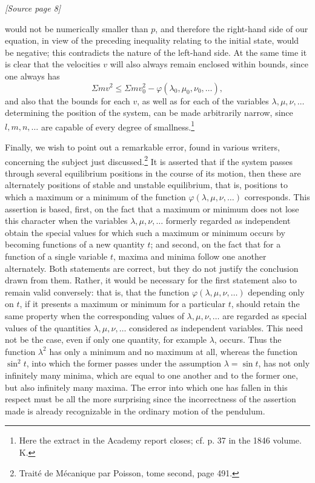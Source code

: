 \documentclass[11pt]{article}
\newcommand{\sourcepage}[1]{\par\smallskip\noindent\textit{[Source page #1]}\par\smallskip}
\begin{document}
\sourcepage{8}

\noindent would not be numerically smaller than $p$, and therefore the right-hand side of our equation, in view of the preceding inequality relating to the initial state, would be negative; this contradicts the nature of the left-hand side. At the same time it is clear that the velocities $v$ will also always remain enclosed within bounds, since one always has
\[
\Sigma m v^2 \leq \Sigma m v_0^2-\varphi(\lambda_0,\mu_0,\nu_0,\ldots),
\]
and also that the bounds for each $v$, as well as for each of the variables $\lambda,\mu,\nu,\ldots$ determining the position of the system, can be made arbitrarily narrow, since $l,m,n,\ldots$ are capable of every degree of smallness.\footnote{Here the extract in the Academy report closes; cf. p. 37 in the 1846 volume. K.}

Finally, we wish to point out a remarkable error, found in various writers, concerning the subject just discussed.\footnote{Traité de Mécanique par Poisson, tome second, page 491.} It is asserted that if the system passes through several equilibrium positions in the course of its motion, then these are alternately positions of stable and unstable equilibrium, that is, positions to which a maximum or a minimum of the function $\varphi(\lambda,\mu,\nu,\ldots)$ corresponds. This assertion is based, first, on the fact that a maximum or minimum does not lose this character when the variables $\lambda,\mu,\nu,\ldots$ formerly regarded as independent obtain the special values for which such a maximum or minimum occurs by becoming functions of a new quantity $t$; and second, on the fact that for a function of a single variable $t$, maxima and minima follow one another alternately. Both statements are correct, but they do not justify the conclusion drawn from them. Rather, it would be necessary for the first statement also to remain valid conversely: that is, that the function $\varphi(\lambda,\mu,\nu,\ldots)$ depending only on $t$, if it presents a maximum or minimum for a particular $t$, should retain the same property when the corresponding values of $\lambda,\mu,\nu,\ldots$ are regarded as special values of the quantities $\lambda,\mu,\nu,\ldots$ considered as independent variables. This need not be the case, even if only one quantity, for example $\lambda$, occurs. Thus the function $\lambda^2$ has only a minimum and no maximum at all, whereas the function $\sin^2 t$, into which the former passes under the assumption $\lambda=\sin t$, has not only infinitely many minima, which are equal to one another and to the former one, but also infinitely many maxima. The error into which one has fallen in this respect must be all the more surprising since the incorrectness of the assertion made is already recognizable in the ordinary motion of the pendulum.
\end{document}

